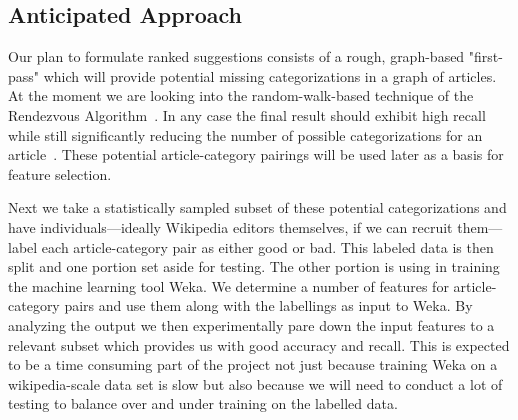 \documentclass{sig-alternate}
\begin{document}
\subsection{Anticipated Approach}
\label{subsec:approach}
Our plan to formulate ranked suggestions consists of a rough, graph-based "first-pass" which will provide potential missing categorizations in a graph of articles. At the moment we are looking into the random-walk-based technique of the Rendezvous Algorithm~\cite{Azran}. In any case the final result should exhibit high recall while still significantly reducing the number of possible categorizations for an article~\cite{Avrachenkov}. These potential article-category pairings will be used later as a basis for feature selection.

Next we take a statistically sampled subset of these potential categorizations and have individuals---ideally Wikipedia editors themselves, if we can recruit them---label each article-category pair as either good or bad.
This labeled data is then split and one portion set aside for testing. The other portion is using in training the machine learning tool Weka. We determine a number of features for article-category pairs and use them along with the labellings as input to Weka. By analyzing the output we then experimentally pare down the input features to a relevant subset which provides us with good accuracy and recall. This is expected to be a time consuming part of the project not just because training Weka on a wikipedia-scale data set is slow but also because we will need to conduct a lot of testing to balance over and under training on the labelled data.
\end{document}
